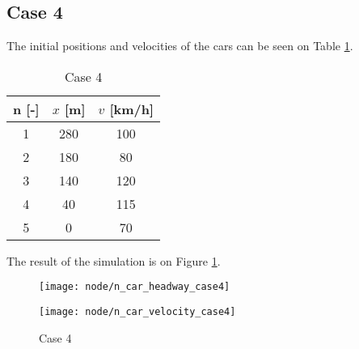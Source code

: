 		\subsection*{Case 4}
		The initial positions and velocities of the cars can be seen on Table \ref{tab:node_case4}.
		\begin{table}
			\centering
			\begin{tabular}{ |c|c|c| }
				\hline
				n [-] & $x$ [m] & $v$ [km/h]\\
				\hline
				1 &  280 & 100 \\
				2 & 180 & 80 \\
				3 & 140 & 120 \\
				4 & 40 & 115 \\
				5 & 0 & 70 \\
				\hline
			\end{tabular}
			\caption{Case 4}
			\label{tab:node_case4}
		\end{table}
		The result of the simulation is on Figure \ref{fig:node_case4}.
		\begin{figure}
			\centering
			\begin{minipage}{.5\textwidth}
				\centering
				\texttt{[image: node/n\_car\_headway\_case4]}
			\end{minipage}\hfill
			\begin{minipage}{.5\textwidth}
				\centering
				\texttt{[image: node/n\_car\_velocity\_case4]}
			\end{minipage}
			\caption{Case 4}
			\label{fig:node_case4}
		\end{figure}
